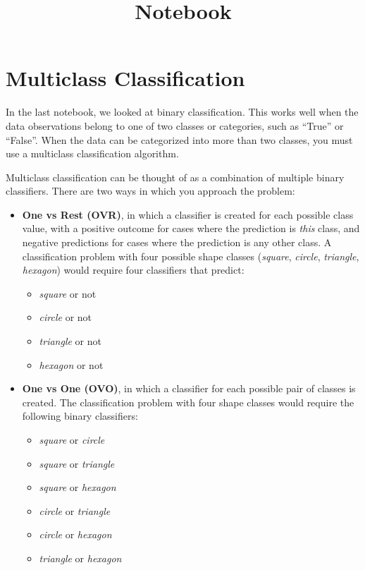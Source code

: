 \documentclass[11pt]{article}
\title{Notebook}
\providecommand{\tightlist}{%
      \setlength{\itemsep}{0pt}\setlength{\parskip}{0pt}}
\begin{document}
    
    \maketitle
    
    

    
    \hypertarget{multiclass-classification}{%
\section{Multiclass Classification}\label{multiclass-classification}}

In the last notebook, we looked at binary classification. This works
well when the data observations belong to one of two classes or
categories, such as ``True'' or ``False''. When the data can be
categorized into more than two classes, you must use a multiclass
classification algorithm.

Multiclass classification can be thought of as a combination of multiple
binary classifiers. There are two ways in which you approach the
problem:

\begin{itemize}
\tightlist
\item
  \textbf{One vs Rest (OVR)}, in which a classifier is created for each
  possible class value, with a positive outcome for cases where the
  prediction is \emph{this} class, and negative predictions for cases
  where the prediction is any other class. A classification problem with
  four possible shape classes (\emph{square}, \emph{circle},
  \emph{triangle}, \emph{hexagon}) would require four classifiers that
  predict:

  \begin{itemize}
  \tightlist
  \item
    \emph{square} or not
  \item
    \emph{circle} or not
  \item
    \emph{triangle} or not
  \item
    \emph{hexagon} or not
  \end{itemize}
\item
  \textbf{One vs One (OVO)}, in which a classifier for each possible
  pair of classes is created. The classification problem with four shape
  classes would require the following binary classifiers:

  \begin{itemize}
  \tightlist
  \item
    \emph{square} or \emph{circle}
  \item
    \emph{square} or \emph{triangle}
  \item
    \emph{square} or \emph{hexagon}
  \item
    \emph{circle} or \emph{triangle}
  \item
    \emph{circle} or \emph{hexagon}
  \item
    \emph{triangle} or \emph{hexagon}
  \end{itemize}
\end{itemize}
\end{document}

